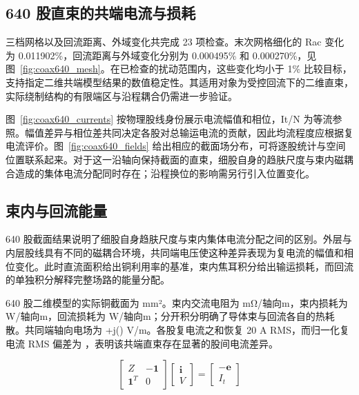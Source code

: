 \subsection{640 股直束的共端电流与损耗}

\hypertarget{04.coax_results.p1}{}
三档网格以及回流距离、外域变化共完成 23 项检查。末次网格细化的 Rac 变化为 0.011902\%，回流距离与外域变化分别为 0.000495\% 和 0.000270\%，见 图~\ref{fig:coax640_mesh}。在已检查的扰动范围内，这些变化均小于 1\% 比较目标，支持指定二维共端模型结果的数值稳定性。其适用对象为受控回流下的二维直束，实际绕制结构的有限端区与沿程耦合仍需进一步验证。

\hypertarget{04.coax_results.p2}{}
图~\ref{fig:coax640_currents} 按物理股线身份展示电流幅值和相位，It/N 为等流参照。幅值差异与相位差共同决定各股对总输运电流的贡献，因此均流程度应根据复电流评价。图~\ref{fig:coax640_fields} 给出相应的截面场分布，可将逐股统计与空间位置联系起来。对于这一沿轴向保持截面的直束，细股自身的趋肤尺度与束内磁耦合造成的集体电流分配同时存在；沿程换位的影响需另行引入位置变化。

\hypertarget{04.interpretation.heading}{}
\subsection{束内与回流能量}

\hypertarget{04.interpretation.p1}{}
640 股截面结果说明了细股自身趋肤尺度与束内集体电流分配之间的区别。外层与内层股线具有不同的磁耦合环境，共同端电压使这种差异表现为复电流的幅值和相位变化。此时直流面积给出铜利用率的基准，束内焦耳积分给出输运损耗，而回流的单独积分解释完整场路的能量分配。

\hypertarget{04.quantitative.p1}{}
640 股二维模型的实际铜截面为  mm²。束内交流电阻为  mΩ/轴向m，束内损耗为  W/轴向m，回流损耗为  W/轴向m；分开积分明确了导体束与回流各自的热耗散。共同端轴向电场为 +j() V/m。各股复电流之和恢复 20 A RMS，而归一化复电流 RMS 偏差为 ，表明该共端直束存在显著的股间电流差异。

\hypertarget{04.equation.E04}{}
\hypertarget{E04}{}\begin{equation}\begin{bmatrix} Z&-\mathbf1\\ \mathbf1^T&0\end{bmatrix}\begin{bmatrix}\mathbf i\\V\end{bmatrix}=\begin{bmatrix}-\mathbf e\\I_t\end{bmatrix}\tag{4}\label{eq:E04}\end{equation}

